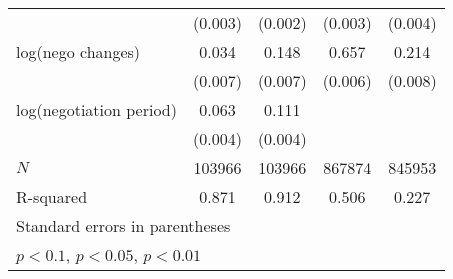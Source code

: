 {\begin{tabular}{l*{4}{c}}
            &     (0.003)         &     (0.002)         &     (0.003)         &     (0.004)         \\
\addlinespace
log(nego changes)&       0.034\sym{***}&       0.148\sym{***}&       0.657\sym{***}&       0.214\sym{***}\\
            &     (0.007)         &     (0.007)         &     (0.006)         &     (0.008)         \\
\addlinespace
log(negotiation period)&       0.063\sym{***}&       0.111\sym{***}&                     &                     \\
            &     (0.004)         &     (0.004)         &                     &                     \\
\midrule
\(N\)       &      103966         &      103966         &      867874         &      845953         \\
R-squared   &       0.871         &       0.912         &       0.506         &       0.227         \\
\bottomrule
\multicolumn{5}{l}{\footnotesize Standard errors in parentheses}\\
\multicolumn{5}{l}{\footnotesize \sym{*} \(p<0.1\), \sym{**} \(p<0.05\), \sym{***} \(p<0.01\)}\\
\end{tabular}
}
